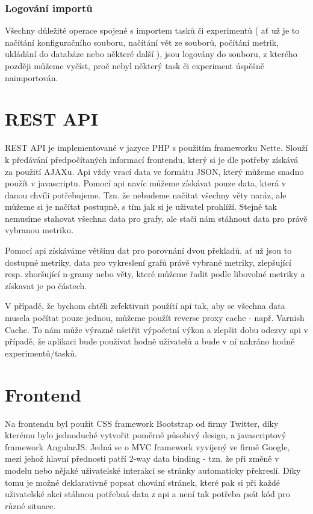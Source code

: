 \subsubsection{Logování importů}
Všechny důležité operace spojené s importem tasků či experimentů
  ( ať už je to načítání konfiguračního souboru, načítání vět ze souborů,
  počítání metrik, ukládání do databáze nebo některé další ), 
  jsou logovány do souboru,
  z kterého později můžeme vyčíst,
  proč nebyl některý task či experiment úspěšně naimportován. 


\section{REST API}
REST API je implementované v jazyce PHP s použitím frameworku Nette.
Slouží k předávání předpočítaných informací frontendu,
  který si je dle potřeby získává za použití AJAXu.
Api vždy vrací data ve formátu JSON,
  který můžeme snadno použít v javascriptu.
Pomocí api navíc můžeme získávat pouze data,
  která v danou chvíli potřebujeme.
Tzn. že nebudeme načítat všechny věty naráz,
  ale můžeme si je načítat postupně,
  s tím jak si je uživatel prohlíží.
Stejně tak nemusíme stahovat všechna data pro grafy,
  ale stačí nám stáhnout data pro právě vybranou metriku.

Pomocí api získáváme většinu dat pro porovnání dvou překladů,
  ať už jsou to dostupné metriky,
  data pro vykreslení grafů právě vybrané metriky,
  zlepšující resp. zhoršující n-gramy
  nebo věty,
  které můžeme řadit podle libovolné metriky a získavat je po částech.

V případě, že bychom chtěli zefektivnit použítí api tak,
  aby se všechna data musela počítat pouze jednou,
  můžeme použít reverse proxy cache - např. Varnish Cache.
To nám může výrazně ušetřit výpočetní výkon a zlepšit dobu odezvy api v případě,
  že aplikaci bude používat hodně uživatelů
  a bude v ní nahráno hodně experimentů/tasků.

\section{Frontend}
Na frontendu byl použit CSS framework Bootstrap od firmy Twitter,
  díky kterému bylo jednoduché vytvořit poměrně působivý design,
  a javascriptový framework AngularJS.
Jedná se o MVC framework vyvíjený ve firmě Google,
  mezi jehož hlavní přednosti patří 2-way data binding -
  tzn. že při změně v modelu nebo nějaké uživatelské interakci se stránky automaticky překreslí.
Díky tomu je možné deklarativně popsat chování stránek,
  které pak si při každé uživatelské akci stáhnou potřebná data z api
  a není tak potřeba psát kód pro různé situace.

